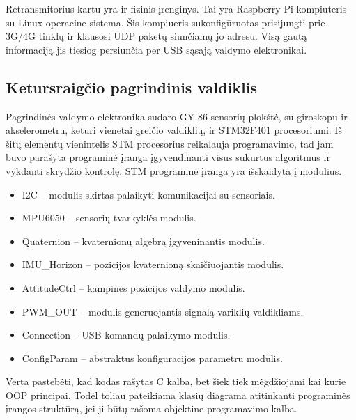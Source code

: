 \documentclass[12pt, a4paper, lithuanian, final]{article}
\begin{document}
Retransmitorius kartu yra ir fizinis įrenginys.
Tai yra Raspberry Pi kompiuteris su Linux operacine sistema.
Šis kompiueris sukonfigūruotas prisijungti prie 3G/4G tinklų ir klausosi UDP paketų siunčiamų jo adresu.
Visą gautą informaciją jis tiesiog persiunčia per USB sąsają valdymo elektronikai.

\subsection{Ketursraigčio pagrindinis valdiklis}

Pagrindinės valdymo elektronika sudaro GY-86 sensorių plokštė, su giroskopu ir akselerometru, keturi vienetai greičio valdiklių, ir STM32F401 procesoriumi.
Iš šitų elementų vienintelis STM procesorius reikalauja programavimo, tad jam buvo parašyta programinė įranga įgyvendinanti visus sukurtus algoritmus ir vykdanti skrydžio kontrolę.
STM programinė įranga yra išskaidyta į modulius.

\begin{itemize}
	\item I2C -- modulis skirtas palaikyti komunikacijai su sensoriais.
	\item MPU6050 -- sensorių tvarkyklės modulis.
	\item Quaternion -- kvaternionų algebrą įgyveninantis modulis.
	\item IMU\_Horizon -- pozicijos kvaternioną skaičiuojantis modulis.
	\item AttitudeCtrl -- kampinės pozicijos valdymo modulis.
	\item PWM\_OUT -- modulis generuojantis signalą variklių valdikliams.
	\item Connection -- USB komandų palaikymo modulis.
	\item ConfigParam -- abstraktus konfiguracijos parametru modulis.
\end{itemize}


Verta pastebėti, kad kodas rašytas C kalba, bet šiek tiek mėgdžiojami kai kurie OOP principai.
Todėl toliau pateikiama klasių diagrama atitinkanti programinės įrangos struktūrą, jei ji būtų rašoma objektine programavimo kalba.
\end{document}
